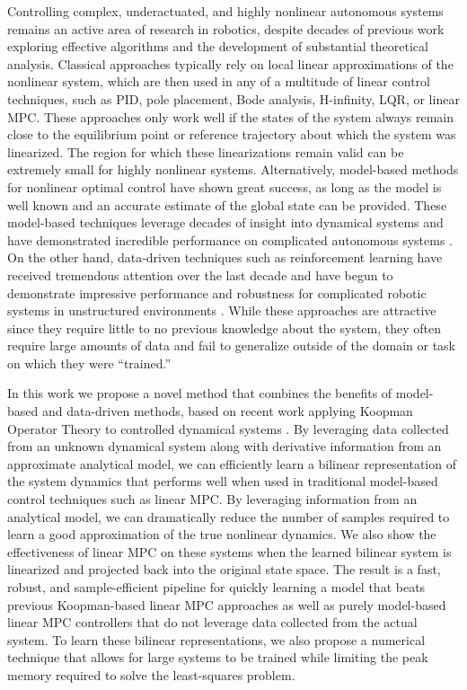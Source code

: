 \documentclass{article}
\begin{document}
Controlling complex, underactuated, and highly nonlinear autonomous systems remains an
active area of research in robotics, despite decades of previous work exploring
effective algorithms and the development of substantial theoretical analysis. Classical
approaches typically rely on local linear approximations of the nonlinear system, which
are then used in any of a multitude of linear control techniques, such as PID, pole
placement, Bode analysis, H-infinity, LQR, or linear MPC.  These approaches only work
well if the states of the system always remain close to the equilibrium point or
reference trajectory about which the system was linearized. The region for which these
linearizations remain valid can be extremely small for highly nonlinear systems.
Alternatively, model-based methods for nonlinear optimal control have shown great
success, as long as the model is well known and an accurate estimate of the global state
can be provided. These model-based techniques leverage decades of insight into
dynamical systems and have demonstrated incredible performance on complicated
autonomous systems 
\cite{Farshidian2017,Kuindersma2014,Bjelonic2021,Subosits2019} . On the
other hand, data-driven techniques such as reinforcement learning have received
tremendous attention over the last decade and have begun to demonstrate impressive
performance and robustness for complicated robotic systems in unstructured environments
\cite{Karnchanachari2020,Hoeller2020,Li2021}. While these approaches are attractive
since they require little to no previous knowledge about the system, they often require
large amounts of data and fail to generalize outside of the domain or task on which they
were ``trained.''

In this work we propose a novel method that combines the benefits of model-based and
data-driven methods, based on recent work  applying Koopman Operator Theory to
controlled dynamical systems 
\cite{Meduri2022,Bruder2021,Korda2018,Folkestad2020,Suh2020}.
By leveraging data collected from an
unknown dynamical system along with derivative information from an approximate
analytical model, we can efficiently learn a bilinear representation of the system
dynamics that performs well when used in traditional model-based control techniques such
as linear MPC. By leveraging information from an analytical model, we can dramatically
reduce the number of samples required to learn a good approximation of the true
nonlinear dynamics. We also show the effectiveness of linear MPC on these systems 
when the learned bilinear system is linearized and projected back into the original 
state space. The result is a fast, robust, and sample-efficient pipeline for quickly 
learning a model that beats previous Koopman-based linear MPC approaches as well as 
purely model-based linear MPC controllers that do not leverage data collected from the 
actual system. To learn these bilinear representations, we also propose 
a numerical technique that allows for large systems to be trained while limiting the 
peak memory required to solve the least-squares problem.
\end{document}
